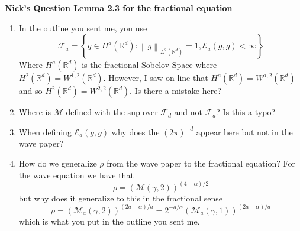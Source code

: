 \documentclass[a4paper,11pt]{article}
\numberwithin{equation}{section}
\theoremstyle{plain}
\theoremstyle{definition}
\newcommand{\Norm}[1]{\left\|  #1   \right\|}
\newcommand{\R}{\mathbb{R}}
\newcounter{NQ}
\newenvironment{NickQuestion}[1][] %
{\refstepcounter{NQ}
	\begin{mdframed}[backgroundcolor=lightgray]\textbf{Nick's Question \theNQ \: #1~~}~~~\noindent}%
	{\end{mdframed}}
\numberwithin{NQ}{section}
\numberwithin{LQ}{section}
\numberwithin{ZQ}{section}
\begin{document}
	\begin{NickQuestion}[Lemma 2.3 for the fractional equation]
		\begin{enumerate}
			\item In the outline you sent me, you use
			\[
			\mathcal{F}_a = \left\{ g \in H^a(\R^d) : \Norm{g}_{L^2(\R^d)}=1, \mathcal{E}_a(g,g) < \infty \right\}
			\]
			Where $H^a(\R^d)$ is the fractional Sobelov Space where $H^2(\R^d) = W^{1,2}(\R^d)$. However, I saw on line that  $H^a(\R^d) = W^{a,2}(\R^d)$ and so $H^2(\R^d) = W^{2,2}(\R^d)$. Is there a mistake here?

			\item Where is $\mathcal{M}$ defined with the sup over $\mathcal{F}_d$ and not $\mathcal{F}_a$? Is this a typo?

			\item When defining $\mathcal{E}_a(g,g)$ why does the $(2\pi)^{-d}$ appear here but not in the wave paper?

			\item How do we generalize $\rho$ from the wave paper to the fractional equation? For the wave equation we have that
			\[
			\rho = \left(\mathcal{M}(\gamma,2)\right)^{(4-\alpha)/2}
			\]
			but why does it generalize to this in the fractional sense
			\[
			\rho = \left(\mathcal{M}_a(\gamma,2)\right)^{(2a-\alpha)/a} = 2^{-a/\alpha}\left(\mathcal{M}_a(\gamma,1)\right)^{(2a-\alpha)/a}
			\]
			which is what you put in the outline you sent me.
		\end{enumerate}
	\end{NickQuestion}
\end{document}
